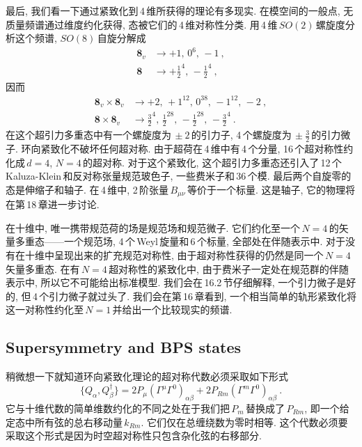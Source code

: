最后, 我们看一下通过紧致化到\,4\,维所获得的理论有多现实. 在模空间的一般点, 无质量频谱通过维度约化获得, 态被它们的\,4\,维对称性分类. 用\,4\,维\,$SO(2)$\,螺旋度分析这个频谱, $SO(8)\,$自旋分解成
\begin{subequations}
    \begin{align}
        \mathbf{8}_{v} &\to +1,\,0^{6},\,-1\:, \label{11.6.21a}  \\
        \mathbf{8} &\to +\tfrac{1}{2}^{4},\,-\tfrac{1}{2}^{4} \:, \label{11.6.21b}
    \end{align}
\end{subequations}  
因而
\begin{subequations}
    \begin{align}
        \mathbf{8}_{v}\times\mathbf{8}_{v} &\to +2,\,+1^{12},\,0^{38},\,-1^{12},\,-2\:, \label{11.6.22a} \\
        \mathbf{8}\times \mathbf{8}_{v} &\to \tfrac{3}{2}^{4},\,\tfrac{1}{2}^{28},\,-\tfrac{1}{2}^{28},\,-\tfrac{3}{2}^{4} \:. \label{11.6.22b}
    \end{align}
\end{subequations}
在这个超引力多重态中有一个螺旋度为$\,\pm2\,$的引力子, 4\,个螺旋度为$\,\pm\frac{3}{2}\,$的引力微子. 环向紧致化不破坏任何超对称. 由于超荷在\,4\,维中有\,4\,个分量, 16\,个超对称性约化成$\,d=4$, $N=4\,$的超对称. 对于这个紧致化, 这个超引力多重态还引入了\,12\,个\,Kaluza-Klein\,和反对称张量规范玻色子, 一些费米子和\,36\,个模. 最后两个自旋零的态是伸缩子和轴子. 在\,4\,维中, 2\,阶张量$\,B_{\mu\nu}\,$等价于一个标量. 这是轴子, 它的物理将在第\,18\,章进一步讨论.

在十维中, 唯一携带规范荷的场是规范场和规范微子. 它们约化至一个$\,N=4\,$的矢量多重态------一个规范场, 4\,个\,Weyl\,旋量和\,6\,个标量, 全部处在伴随表示中. 对于没有在十维中呈现出来的扩充规范对称性, 由于超对称性获得的仍然是同一个$\,N=4\,$矢量多重态. 在有$\,N=4\,$超对称性的紧致化中, 由于费米子一定处在规范群的伴随表示中, 所以它不可能给出标准模型. 我们会在\,16.2\,节仔细解释, 一个引力微子是好的, 但\,4\,个引力微子就过头了. 我们会在第\,16\,章看到, 一个相当简单的轨形紧致化将这一对称性约化至$\,N=1$\,并给出一个比较现实的频谱.

\subsection*{Supersymmetry and BPS states}

稍微想一下就知道环向紧致化理论的超对称代数必须采取如下形式
\begin{equation}
    \{Q_{\alpha},Q^{\dag}_{\beta}\} = 2P_{\mu}(\Gamma^{\mu}\Gamma^{0})_{\alpha\beta} +2P_{Rm}(\Gamma^{m}\Gamma^{0})_{\alpha\beta} \:. \label{11.6.23}
\end{equation}
它与十维代数的简单维数约化的不同之处在于我们把$\,P_{m}\,$替换成了$\,P_{Rm}$, 即一个给定态中所有弦的总右移动量$\,k_{Rm}$. 它们仅在总缠绕数为零时相等. 这个代数必须要采取这个形式是因为时空超对称性只包含杂化弦的右移部分.

